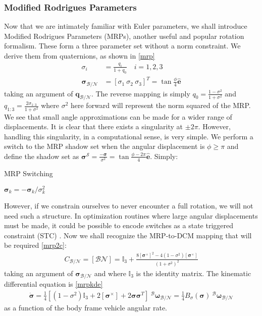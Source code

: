 \subsubsection{Modified Rodrigues Parameters}
Now that we are intimately familiar with Euler parameters, we shall introduce Modified Rodrigues Parameters (MRPs), another useful and popular rotation formalism. These form a three parameter set without a norm constraint. We derive them from quaternions, as shown in \ref{mrp}
%
\begin{align}
\label{mrp}
	\sigma_i &= \frac{q_i}{1+q_0} \quad i = 1,2,3 \\
	\boldsymbol{\sigma}_\mathcal{B/N} &= [\sigma_1 \ \sigma_2 \ \sigma_3]^T = \tan\frac{\phi}{4}\hat{\bm{e}}
\end{align}
taking an argument of $\bm{q}_\mathcal{B/N}$. The reverse mapping is simply $q_0 = \frac{1-\sigma^2}{1+\sigma^2}$ and $q_{1:3} = \frac{2\sigma_{1:3}}{1+\sigma^2}$ where $\sigma^2$ here forward will represent the norm squared of the MRP. We see that small angle approximations can be made for a wider range of displacements. It is clear that there exists a singularity at $\pm 2\pi$. However, handling this singularity, in a computational sense, is very simple. We perform a switch to the MRP shadow set when the angular displacement is $\phi \geq \pi$ and define the shadow set as $\boldsymbol{\sigma}^\mathcal{S} = \frac{-\boldsymbol{\sigma}}{\sigma^2} = \tan{\frac{\phi-2\pi}{4}}\hat{\bm{e}}$. Simply: 

\begin{algorithm}
\caption{MRP Switching}\label{mrpswitch}
\begin{algorithmic}[1]
\State $\boldsymbol{\sigma}_{k} = -{\boldsymbol{\sigma}_{k}}/{\sigma_k^2}$
\EndIf 
\EndProcedure
\end{algorithmic}
\end{algorithm}
However, if we constrain ourselves to never encounter a full rotation, we will not need such a structure. In optimization routines where large angular displacements must be made, it could be possible to encode switches as a state triggered constraint (STC) \cite{szmuk2019successive}. Now we shall recognize the MRP-to-DCM mapping that will be required \ref{mrp2c}:
\begin{align}
\label{mrp2c}
	C_{\mathcal{B/N}} = [\mathcal{BN}]= \mathbb{I}_3 +  \frac{8[\boldsymbol{\sigma}^\times]^2 - 4(1-\sigma^2)[\boldsymbol{\sigma}^\times]}{(1+\sigma^2)^2}
\end{align}
taking an argument of $\boldsymbol{\sigma}_\mathcal{B/N}$ and where $\mathbb{I}_3$ is the identity matrix. The kinematic differential equation is \ref{mrpkde}
%
\begin{align}
\label{mrpkde}
	\dot{\boldsymbol{\sigma}} = \frac{1}{4}[(1-\sigma^2)\mathbb{I}_3 +  2[\boldsymbol{\sigma}^\times] + 2\boldsymbol{\sigma}\boldsymbol{\sigma}^T] \ ^\mathcal{B}\boldsymbol{\omega}_\mathcal{B/N} = \frac{1}{4}B_\sigma(\boldsymbol{\sigma}) \ ^\mathcal{B}\boldsymbol{\omega}_\mathcal{B/N}
\end{align}
as a function of the body frame vehicle angular rate.

